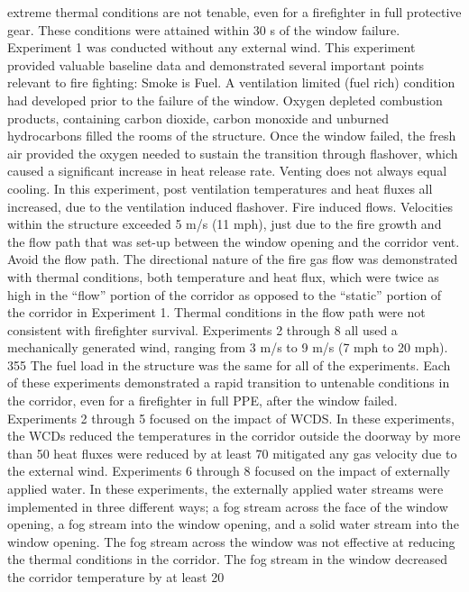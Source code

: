 \documentclass[12pt,oneside]{book}
\begin{document}
extreme thermal conditions are not tenable, even for a firefighter in full protective gear. These
conditions were attained within 30 s of the window failure.
Experiment 1 was conducted without any external wind. This experiment provided valuable baseline
data and demonstrated several important points relevant to fire fighting:
Smoke is Fuel. A ventilation limited (fuel rich) condition had developed prior to the failure of
the window. Oxygen depleted combustion products, containing carbon dioxide, carbon monoxide and
unburned hydrocarbons filled the rooms of the structure. Once the window failed, the fresh air provided
the oxygen needed to sustain the transition through flashover, which caused a significant increase in heat
release rate.
Venting does not always equal cooling. In this experiment, post ventilation temperatures and
heat fluxes all increased, due to the ventilation induced flashover.
Fire induced flows. Velocities within the structure exceeded 5 m/s (11 mph), just due to the fire
growth and the flow path that was set-up between the window opening and the corridor vent.
Avoid the flow path. The directional nature of the fire gas flow was demonstrated with thermal
conditions, both temperature and heat flux, which were twice as high in the “flow” portion of the
corridor as opposed to the “static” portion of the corridor in Experiment 1. Thermal conditions in the
flow path were not consistent with firefighter survival.
Experiments 2 through 8 all used a mechanically generated wind, ranging from 3 m/s to 9 m/s (7 mph to
20 mph). 355
The fuel load in the structure was the same for all of the experiments. Each of these experiments
demonstrated a rapid transition to untenable conditions in the corridor, even for a firefighter in full PPE,
after the window failed.
Experiments 2 through 5 focused on the impact of WCDS. In these experiments, the WCDs reduced
the temperatures in the corridor outside the doorway by more than 50 %
heat fluxes were reduced by at least 70 %
mitigated any gas velocity due to the external wind.
Experiments 6 through 8 focused on the impact of externally applied water. In these experiments, the
externally applied water streams were implemented in three different ways; a fog stream across the face
of the window opening, a fog stream into the window opening, and a solid water stream into the window
opening. The fog stream across the window was not effective at reducing the thermal conditions in the
corridor. The fog stream in the window decreased the corridor temperature by at least 20 %
\end{document}

